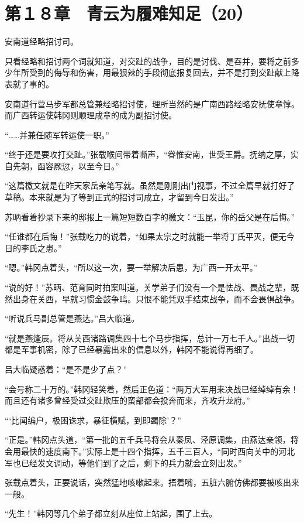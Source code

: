 \section{第１８章　青云为履难知足（20）}

安南道经略招讨司。

只看经略和招讨两个词就知道，对交趾的战争，目的是讨伐、是吞并，要将之前多少年所受到的侮辱和伤害，用最狠辣的手段彻底报复回去，并不是打到交趾献上降表就了事的。

安南道行营马步军都总管兼经略招讨使，理所当然的是广南西路经略安抚使章惇。而广西转运使韩冈则顺理成章的成为副招讨使。

“……并兼任随军转运使一职。”

“终于还是要攻打交趾。”张载喉间带着嘶声，“眷惟安南，世受王爵。抚纳之厚，实自先朝，函容厥愆，以至今日。”

“这篇檄文就是在昨天家岳亲笔写就。虽然是刚刚出门视事，不过全篇早就打好了草稿。本来就是为了等到正式的招讨司成立，才留到今日发出。”

苏昞看着抄录下来的邸报上一篇短短数百字的檄文：“玉昆，你的岳父是在后悔。”

“任谁都在后悔！”张载吃力的说着，“如果太宗之时就能一举将丁氏平灭，便无今日的李氏之患。”

“嗯。”韩冈点着头，“所以这一次，要一举解决后患，为广西一开太平。”

“说的好！”苏昞、范育同时拍案叫道。关学弟子们没有一个是怯战、畏战之辈，既然出身在关西，早就习惯金鼓争鸣。只恨不能凭双手结束战争，而不会畏惧战争。

“听说兵马副总管是燕达。”吕大临道。

“就是燕逢辰。将从关西诸路调集四十七个马步指挥，总计一万七千人。”出战一切都是军事机密，除了已经暴露出来的信息以外，韩冈不能说得再细了。

吕大临疑惑着：“是不是少了点？”

“会号称二十万的。”韩冈轻笑着，然后正色道：“两万大军用来决战已经绰绰有余！而且还有诸多曾经受过交趾欺压的蛮部都会投奔而来，齐攻升龙府。”

“‘比闻编户，极困诛求，暴征横赋，到即蠲除’？”

“正是。”韩冈点头道，“第一批的五千兵马将会从秦凤、泾原调集，由燕达亲领，将会用最快的速度南下。”实际上是十四个指挥，五千三百人，“同时西向关中的河北军也已经发文调动，等他们到了之后，剩下的兵力就会立刻出发。”

张载点着头，正要说话，突然猛地咳嗽起来。捂着嘴，五脏六腑仿佛都要被咳出来一般。

“先生！”韩冈等几个弟子都立刻从座位上站起，围了上去。

